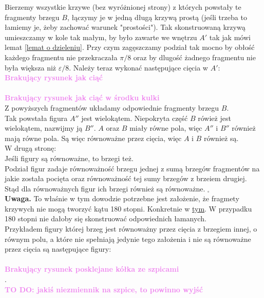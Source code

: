 \documentclass[a4paper, 12pt]{article}
\newcommand{\todo}[1]{\hfill \break \textbf{\Huge \textcolor{violet}{TO DO: #1} \hfill \break}\normalsize}
\newcommand{\rysunek}[1]{\hfill \break\\[16pt] \Huge \textbf{\textcolor{violet}{Brakujący rysunek \normalsize
#1}} \hfill
\break \\[16pt] \normalsize}
\begin{document}
Bierzemy wszystkie krzywe (bez wyróżnionej strony) z których powstały te fragmenty brzegu $B$, łączymy je
w jedną długą krzywą prostą (jeśli trzeba to łamiemy je, żeby zachować warunek "prostości").
Tak skonstruowaną krzywą umieszczamy w kole tak małym, by było zawarte we wnętrzu $A'$ tak jak mówi lemat
\ref{lemat o dzieleniu}. Przy czym zagęszczamy podział tak mocno by obłość każdego fragmentu nie
przekraczała $\pi/8$ oraz by dlugość żadnego fragmentu nie była większa niż $\varepsilon/8$.
Należy teraz wykonać następujące cięcia w $A'$:
\rysunek{jak ciąć}
\rysunek{jak ciąć w środku kulki}
Z powyższych fragmentów układamy odpowiednie fragmenty brzegu $B$. \\
Tak powstała figura $A''$ jest wielokątem. Niepokryta część $B$ rówież jest wielokątem,
nazwijmy ją $B''$. $A$ oraz $B$ miały równe pola, więc $A''$ i $B''$ również mają równe pola.
Są więc równoważne przez cięcia, więc $A$ i $B$ również są. \\[8pt]

W drugą stronę: \\
Jeśli figury są równoważne, to brzegi też. \\
Podział figur zadaje równoważność brzegu jednej z sumą brzegów fragmentów na jakie została pocięta
oraz równoważność tej sumy brzegów z brzeiem drugiej. Stąd dla równoważnych figur ich brzegi również są
równoważne.
$_\square$ \\
\textbf{Uwaga.} To właśnie w tym dowodzie potrzebne jest założenie, że fragmety krzywych nie mogą tworzyć
kątu 180 stopni. Konkretnie w \hyperref[180 stopni]{tym}. W przypadku 180 stopni nie dałoby się skonstruować
odpowiednich łamanych. \\
Przykładem figury której brzeg jest równoważny przez cięcia z brzegiem innej, o równym polu, a które nie
spełniają jedynie tego założenia i nie są równoważne przez cięcia są następujące figury: \\
\rysunek{posklejane kółka ze szpicami}.
 \\
\todo{jakiś niezmiennik na szpice, to powinno wyjść}
\end{document}
